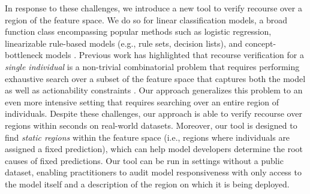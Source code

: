 In response to these challenges, we introduce a new tool to verify recourse over a region of the feature space. We do so for linear classification models, a broad function class encompassing popular methods such as logistic regression, linearizable rule-based models (e.g., rule sets, decision lists), and concept-bottleneck models \cite{koh2020concept, sun2024concept}. Previous work has highlighted that recourse verification for a \emph{single individual} is a non-trivial combinatorial problem that requires performing exhaustive search over a subset of the feature space that captures both the model as well as actionability constraints \cite{ustun2019actionable, kothari2023prediction}. Our approach generalizes this problem to an even more intensive setting that requires searching over an entire region of individuals. Despite these challenges, our approach is able to verify recourse over regions within seconds on real-world datasets. Moreover, our tool is designed to find \emph{static regions} within the feature space (i.e., regions where individuals are assigned a fixed prediction), which can help model developers determine the root causes of fixed predictions. Our tool can be run in settings without a public dataset, enabling practitioners to audit model responsiveness with only access to the model itself and a description of the region on which it is being deployed. 


